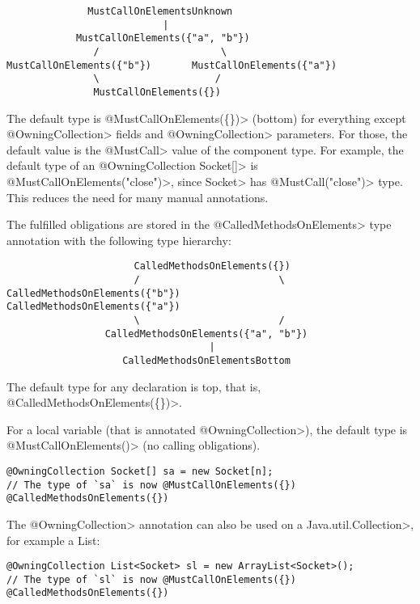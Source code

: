 \begin{verbatim}
              MustCallOnElementsUnknown
                           |
            MustCallOnElements({"a", "b"})
               /                     \
MustCallOnElements({"b"})       MustCallOnElements({"a"})
               \                    /
               MustCallOnElements({})
\end{verbatim}

The default type is \<@MustCallOnElements(\{\})> (bottom) for everything except
\<@OwningCollection> fields and \<@OwningCollection> parameters. For those, the
default \MustCallOnElements value is the \<@MustCall> value of the component
type. For example, the default type of an \<@OwningCollection Socket[]> is
\<@MustCallOnElements({"close"})>, since \<Socket> has \<@MustCall("close")>
type. This reduces the need for many manual annotations.

The fulfilled obligations are stored in the \<@CalledMethodsOnElements> type annotation with the following type hierarchy:
\begin{verbatim}
                      CalledMethodsOnElements({})
                      /                        \
CalledMethodsOnElements({"b"})           CalledMethodsOnElements({"a"})
                      \                        /
                 CalledMethodsOnElements({"a", "b"})
                                   |
                    CalledMethodsOnElementsBottom
\end{verbatim}
The default type for any declaration is top, that is, \<@CalledMethodsOnElements(\{\})>.



For a local variable (that is annotated \<@OwningCollection>), the default
type is \<@MustCallOnElements({})> (no calling obligations).

\begin{Verbatim}
@OwningCollection Socket[] sa = new Socket[n];
// The type of `sa` is now @MustCallOnElements({}) @CalledMethodsOnElements({})
\end{Verbatim}


The \<@OwningCollection> annotation can also be used on a \<Java.util.Collection>, for example a List:
\begin{Verbatim}
@OwningCollection List<Socket> sl = new ArrayList<Socket>();
// The type of `sl` is now @MustCallOnElements({}) @CalledMethodsOnElements({})
\end{Verbatim}

